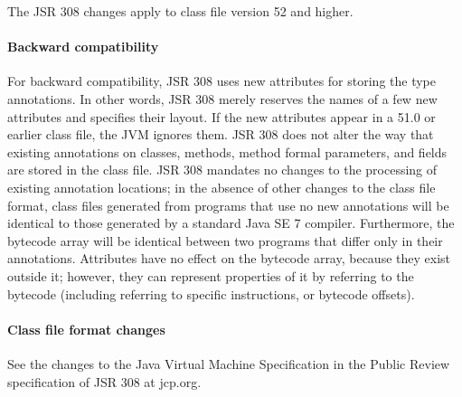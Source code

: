 \documentclass[10pt]{article}
\begin{document}

The JSR 308 changes apply to class file version 52 and higher.


\paragraph{Backward compatibility}
For backward compatibility, JSR 308 uses new attributes for storing
the type annotations.  In other words, JSR 308 merely reserves the
names of a few new attributes and specifies their layout.
If the new attributes appear in a 51.0 or earlier
class file, the JVM ignores them.
JSR 308 does
not alter the way that existing annotations on classes, methods, method formal parameters,
and fields are stored in the class file.
JSR 308 mandates no changes to the processing of existing annotation locations;
in the absence of other changes to the class file format,
class files generated from programs that use no new
annotations will be identical to those generated by a standard Java SE 7
compiler.
Furthermore, the bytecode array will be identical between two programs that
differ only in their annotations.
Attributes have no effect on the bytecode array, because they exist outside
it; however, they can represent properties of it by referring to the
bytecode (including referring to specific instructions, or bytecode offsets).



\paragraph{Class file format changes}
See the changes to the Java Virtual Machine Specification in
the Public Review specification of JSR 308 at jcp.org.
\end{document}

